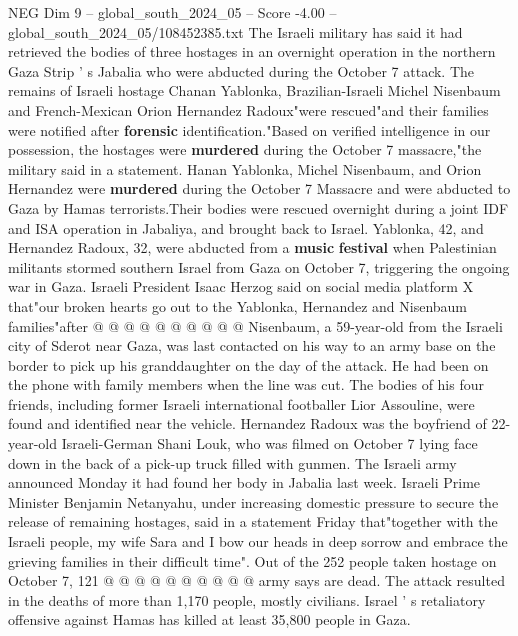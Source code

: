 \begin{textsample}{NEG Dim 9 – global\_south\_2024\_05 – Score -4.00 – global\_south\_2024\_05/108452385.txt}  \label{ex:f9_neg_408}
The Israeli military has said it had retrieved the bodies of three hostages in an overnight operation in the northern Gaza Strip ' s Jabalia who were abducted during the October 7 attack.
The remains of Israeli hostage Chanan Yablonka, Brazilian-Israeli Michel Nisenbaum and French-Mexican Orion Hernandez Radoux"were rescued"and their families were notified after \textbf{forensic} identification."Based on verified intelligence in our possession, the hostages were \textbf{murdered} during the October 7 massacre,"the military said in a statement.
Hanan Yablonka, Michel Nisenbaum, and Orion Hernandez were \textbf{murdered} during the October 7 Massacre and were abducted to Gaza by Hamas terrorists.Their bodies were rescued overnight during a joint IDF and ISA operation in Jabaliya, and brought back to Israel.
Yablonka, 42, and Hernandez Radoux, 32, were abducted from a \textbf{music} \textbf{festival} when Palestinian militants stormed southern Israel from Gaza on October 7, triggering the ongoing war in Gaza.
Israeli President Isaac Herzog said on social media platform X that"our broken hearts go out to the Yablonka, Hernandez and Nisenbaum families"after @ @ @ @ @ @ @ @ @ @ Nisenbaum, a 59-year-old from the Israeli city of Sderot near Gaza, was last contacted on his way to an army base on the border to pick up his granddaughter on the day of the attack.
He had been on the phone with family members when the line was cut.
The bodies of his four friends, including former Israeli international footballer Lior Assouline, were found and identified near the vehicle.
Hernandez Radoux was the boyfriend of 22-year-old Israeli-German Shani Louk, who was filmed on October 7 lying face down in the back of a pick-up truck filled with gunmen.
The Israeli army announced Monday it had found her body in Jabalia last week.
Israeli Prime Minister Benjamin Netanyahu, under increasing domestic pressure to secure the release of remaining hostages, said in a statement Friday that"together with the Israeli people, my wife Sara and I bow our heads in deep sorrow and embrace the grieving families in their difficult time".
Out of the 252 people taken hostage on October 7, 121 @ @ @ @ @ @ @ @ @ @ army says are dead.
The attack resulted in the deaths of more than 1,170 people, mostly civilians.
Israel ' s retaliatory offensive against Hamas has killed at least 35,800 people in Gaza.

\end{textsample}

